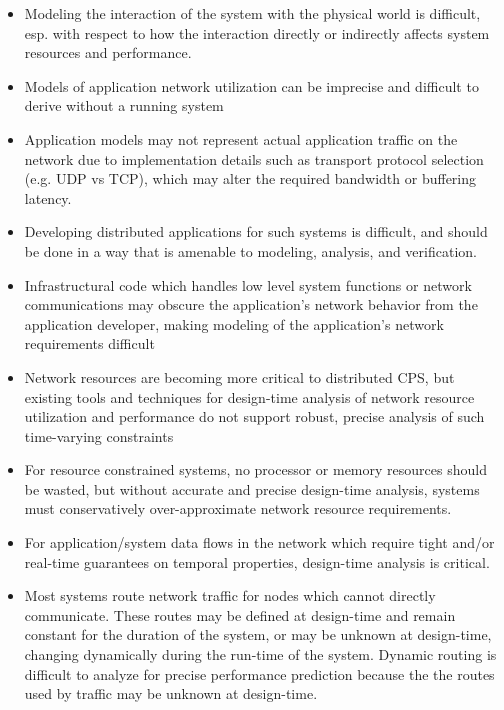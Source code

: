 \begin{itemize}
\item Modeling the interaction of the system with the physical world
  is difficult, esp. with respect to how the interaction directly or
  indirectly affects system resources and performance.
\item Models of application network utilization can be imprecise and
  difficult to derive without a running system
\item Application models may not represent actual application traffic
  on the network due to implementation details such as transport
  protocol selection (e.g. UDP vs TCP), which may alter the required
  bandwidth or buffering latency.
\item Developing distributed applications for such systems is
  difficult, and should be done in a way that is amenable to modeling,
  analysis, and verification.
\item Infrastructural code which handles low level system functions or
  network communications may obscure the application's network
  behavior from the application developer, making modeling of the
  application's network requirements difficult
\item Network resources are becoming more critical to distributed CPS,
  but existing tools and techniques for design-time analysis of
  network resource utilization and performance do not support robust,
  precise analysis of such time-varying constraints
\item For resource constrained systems, no processor or memory
  resources should be wasted, but without accurate and precise
  design-time analysis, systems must conservatively over-approximate
  network resource requirements.
\item For application/system data flows in the network which require
  tight and/or real-time guarantees on temporal properties,
  design-time analysis is critical.
\item Most systems route network traffic for nodes which cannot
  directly communicate. These routes may be defined at design-time and
  remain constant for the duration of the system, or may be unknown at
  design-time, changing dynamically during the run-time of the system.
  Dynamic routing is difficult to analyze for precise performance
  prediction because the the routes used by traffic may be unknown at
  design-time.  
\end{itemize}

